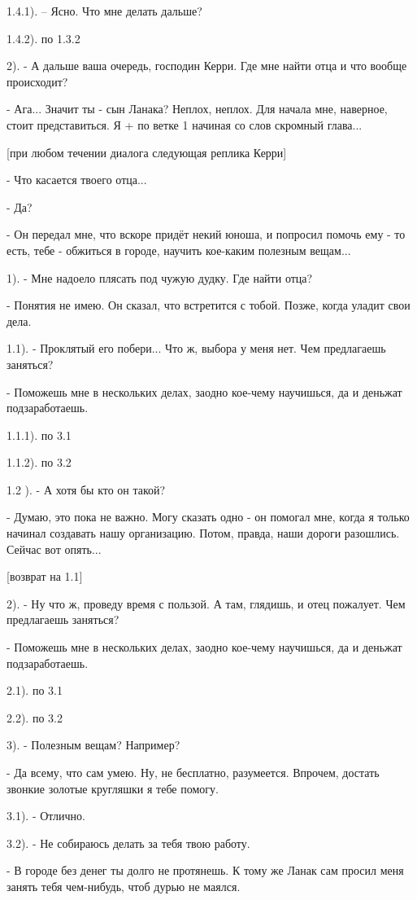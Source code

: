 \documentclass[12pt,a4paper]{book}
\begin{document}
1.4.1). – Ясно. Что мне делать дальше?

1.4.2). по 1.3.2

2). - А дальше ваша очередь, господин Керри. Где мне найти отца и что вообще происходит?

- Ага... Значит ты - сын Ланака? Неплох, неплох. Для начала мне, наверное, стоит представиться. Я + по ветке 1 начиная со слов скромный глава...

[при любом течении диалога следующая реплика Керри]

- Что касается твоего отца...

- Да?

- Он передал мне, что вскоре придёт некий юноша, и попросил помочь ему - то есть, тебе - обжиться в городе, научить кое-каким полезным вещам...

1). - Мне надоело плясать под чужую дудку. Где найти отца?

- Понятия не имею. Он сказал, что встретится с тобой. Позже, когда уладит свои дела.

1.1). - Проклятый его побери... Что ж, выбора у меня нет. Чем предлагаешь заняться?

- Поможешь мне в нескольких делах, заодно кое-чему научишься, да и деньжат подзаработаешь.

1.1.1). по 3.1

1.1.2). по 3.2

1.2 ). - А хотя бы кто он такой?

- Думаю, это пока не важно. Могу сказать одно - он помогал мне, когда я только начинал создавать нашу организацию. Потом, правда, наши дороги разошлись. Сейчас вот опять...

[возврат на 1.1]

2). - Ну что ж, проведу время с пользой. А там, глядишь, и отец пожалует. Чем предлагаешь заняться?

- Поможешь мне в нескольких делах, заодно кое-чему научишься, да и деньжат подзаработаешь.

2.1). по 3.1

2.2). по 3.2

3). - Полезным вещам? Например?

- Да всему, что сам умею. Ну, не бесплатно, разумеется. Впрочем, достать звонкие золотые кругляшки я тебе помогу.

3.1). - Отлично.

3.2). - Не собираюсь делать за тебя твою работу.

- В городе без денег ты долго не протянешь. К тому же Ланак сам просил меня занять тебя чем-нибудь, чтоб дурью не маялся.
\end{document}
